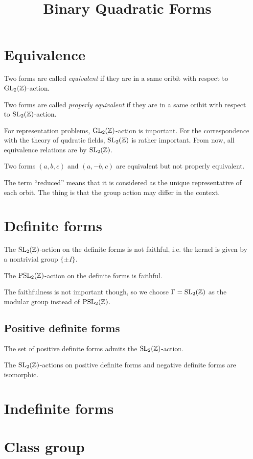\documentclass{../exp}
\title{Binary Quadratic Forms}
\begin{document}
\maketitle

\section{Equivalence}


\begin{defn}
Two forms are called \emph{equivalent} if they are in a same oribit with respect to $\mathrm{GL}_2(\mathbb{Z})$-action.
\end{defn}

\begin{defn}
Two forms are called \emph{properly equivalent} if they are in a same oribit with respect to $\mathrm{SL}_2(\mathbb{Z})$-action.
\end{defn}

For representation problems, $\mathrm{GL}_2(\mathbb{Z})$-action is important.
For the correspondence with the theory of qudratic fields, $\mathrm{SL}_2(\mathbb{Z})$ is rather important.
From now, all equivalence relations are by $\mathrm{SL}_2(\mathbb{Z})$.

\begin{ex}
Two forms $(a,b,c)$ and $(a,-b,c)$ are equivalent but not properly equivalent.
\end{ex}
The term ``reduced'' means that it is considered as the unique representative of each orbit.
The thing is that the group action may differ in the context.

\section{Definite forms}

\begin{prop}
The $\mathrm{SL}_2(\mathbb{Z})$-action on the definite forms is not faithful, i.e. the kernel is given by a nontrivial group $\{\pm I\}$.
\end{prop}
\begin{prop}
The $\mathrm{PSL}_2(\mathbb{Z})$-action on the definite forms is faithful.
\end{prop}
The faithfulness is not important though, so we choose $\Gamma=\mathrm{SL}_2(\mathbb{Z})$ as the modular group instead of $\mathrm{PSL}_2(\mathbb{Z})$.


\subsection{Positive definite forms}
\begin{prop}
The set of positive definite forms admits the $\mathrm{SL}_2(\mathbb{Z})$-action.
\end{prop}
\begin{prop}
The $\mathrm{SL}_2(\mathbb{Z})$-actions on positive definite forms and negative definite forms are isomorphic.
\end{prop}



\section{Indefinite forms}


\section{Class group}
\end{document}
